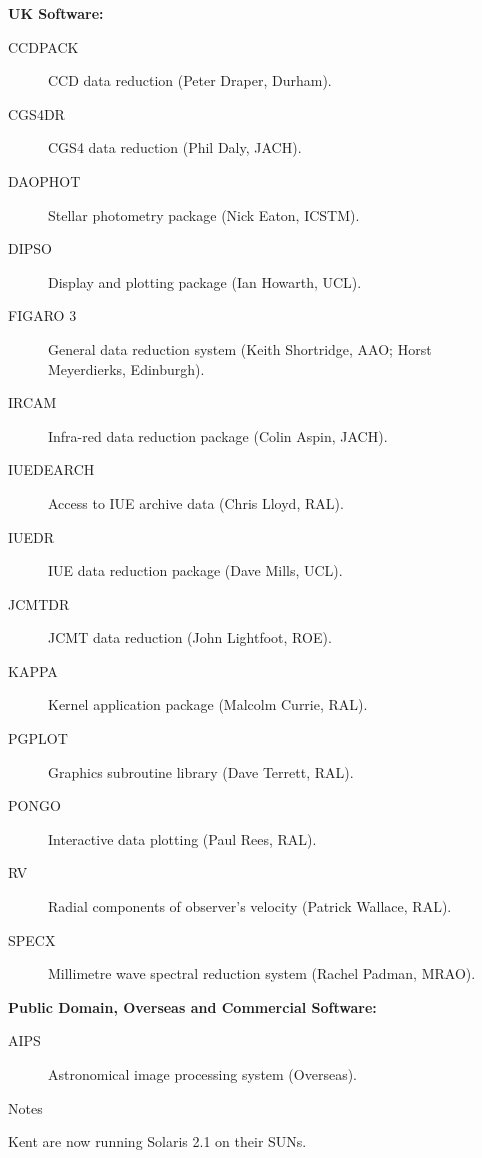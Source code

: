 \begin{center}
{\bf UK Software:}
\end{center}

\begin{description}
\item[CCDPACK] CCD data reduction (Peter Draper, Durham).
\item[CGS4DR] CGS4 data reduction (Phil Daly, JACH).
\item[DAOPHOT] Stellar photometry package (Nick Eaton, ICSTM).
\item[DIPSO] Display and plotting package (Ian Howarth, UCL).
\item[FIGARO 3] General data reduction system (Keith Shortridge, AAO; Horst
Meyerdierks, Edinburgh).
\item[IRCAM] Infra-red data reduction package (Colin Aspin, JACH).
\item[IUEDEARCH] Access to IUE archive data (Chris Lloyd, RAL).
\item[IUEDR] IUE data reduction package (Dave Mills, UCL).
\item[JCMTDR] JCMT data reduction (John Lightfoot, ROE).
\item[KAPPA] Kernel application package (Malcolm Currie, RAL).
\item[PGPLOT] Graphics subroutine library (Dave Terrett, RAL).
\item[PONGO] Interactive data plotting (Paul Rees, RAL).
\item[RV] Radial components of observer's velocity (Patrick Wallace, RAL).
\item[SPECX] Millimetre wave spectral reduction system (Rachel Padman, MRAO).
\end{description}


\vspace{5mm}
\begin{center}
{\bf Public Domain, Overseas and Commercial Software:}
\end{center}

\begin{description}
\item[AIPS] Astronomical image processing system (Overseas).
\end{description}


\vspace{5mm}
\begin{center}
{\large\sc Notes}
\end{center}

Kent are now running Solaris 2.1 on their SUNs.


